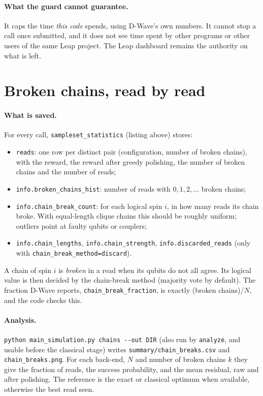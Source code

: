 \documentclass[11pt,a4paper]{article}
\newcommand{\code}[1]{\nolinkurl{#1}}
\newcommand{\src}[4]{}
\begin{document}
\paragraph{What the guard cannot guarantee.} It caps the time \emph{this code} spends, using D-Wave's own numbers.
It cannot stop a call once submitted, and it does not see time spent by other programs or other users of the same
Leap project. The Leap dashboard remains the authority on what is left.

\section{Broken chains, read by read}\label{sec:chains}
\paragraph{What is saved.} For every call, \code{sampleset_statistics} (listing above) stores:
\begin{itemize}
\item \code{reads}: one row per distinct pair (configuration, number of broken chains), with the reward, the reward after greedy polishing, the number of broken chains and the number of reads;
\item \code{info.broken_chains_hist}: number of reads with $0,1,2,\dots$ broken chains;
\item \code{info.chain_break_count}: for each logical spin $i$, in how many reads its chain broke. With equal-length clique chains this should be roughly uniform; outliers point at faulty qubits or couplers;
\item \code{info.chain_lengths}, \code{info.chain_strength}, \code{info.discarded_reads} (only with \code{chain_break_method=discard}).
\end{itemize}
A chain of spin $i$ is \emph{broken} in a read when its qubits do not all agree. Its logical value is then decided by the chain-break method (majority vote by default). The fraction D-Wave reports, \code{chain_break_fraction}, is exactly (broken chains)/$N$, and the code checks this.

\paragraph{Analysis.} \code{python main_simulation.py chains --out DIR} (also run by \code{analyze}, and usable before the classical stage) writes \code{summary/chain_breaks.csv} and \code{chain_breaks.png}. For each back-end, $N$ and number of broken chains $k$ they give the fraction of reads, the success probability, and the mean residual, raw and after polishing. The reference is the exact or classical optimum when available, otherwise the best read seen.
\src{main_simulation.py}{\rCbtA}{\rCbtB}{solution quality vs number of broken chains}
\end{document}
